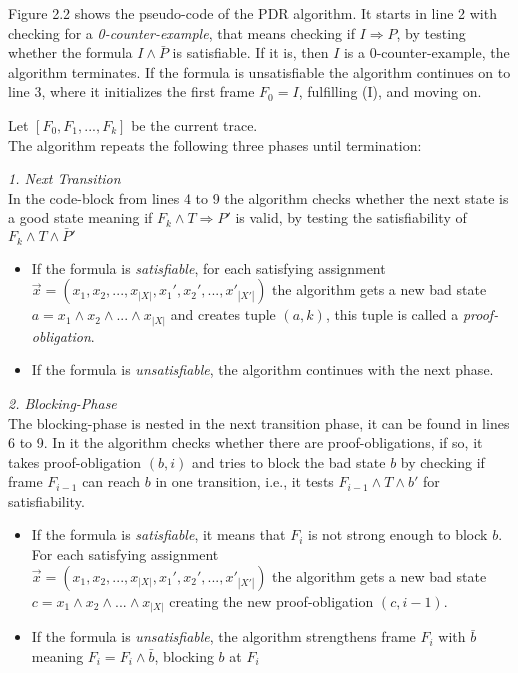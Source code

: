 \documentclass[11pt, a4paper, BCOR=10mm, ngerman]{scrbook}
\begin{document}
Figure 2.2 shows the pseudo-code of the PDR algorithm. It starts in line 2 with checking for a \textsl{0-counter-example}, that means checking if $I \Rightarrow P$, by testing whether the formula $I \land \bar P$ is satisfiable. If it is, then $I$ is a 0-counter-example, the algorithm terminates.
If the formula is unsatisfiable the algorithm continues on to line 3, where it initializes the first frame $F_0 = I$, fulfilling (I), and moving on. \par

Let $[F_0, F_1, ..., F_k]$ be the current trace. \\ 
The algorithm repeats the following three phases until termination: \par

\textsl{1. Next Transition} \\ In the code-block from lines 4 to 9 the algorithm checks whether the next state is a good state meaning if $F_k \land T \Rightarrow P'$ is valid, by testing the satisfiability of $F_k \land T \land \bar P'$ 
\begin{itemize}
\item If the formula is \textsl{satisfiable}, for each satisfying assignment \\ $\vec{x} = (x_1, x_2, ..., x_{|X|}, x_1', x_2', ..., x'_{|X'|})$ the algorithm gets a new bad state \\ $a = x_1 \land x_2 \land ... \land x_{|X|}$ and creates tuple $(a, k)$, this tuple is called a \textsl{proof-obligation}.

\item If the formula is \textsl{unsatisfiable}, the algorithm continues with the next phase. \\
\end{itemize}


\textsl{2. Blocking-Phase} \\ The blocking-phase is nested in the next transition phase, it can be found in lines 6 to 9. In it the algorithm checks whether there are proof-obligations, if so, 
it takes proof-obligation $(b, i)$ and tries to block the bad state $b$ by checking if frame $F_{i-1}$ can reach $b$ in one transition, i.e., it tests $F_{i-1} \land T \land b'$ for satisfiability.

\begin{itemize}
\item If the formula is \textsl{satisfiable}, it means that $F_{i}$ is not strong enough to block $b$. For each satisfying assignment \\ $\vec{x} = (x_1, x_2, ..., x_{|X|}, x_1', x_2', ..., x'_{|X'|})$ the algorithm gets a new bad state \\ $c = x_1 \land x_2 \land ... \land x_{|X|}$ creating the new proof-obligation $(c, i-1)$.

\item If the formula is \textsl{unsatisfiable}, the algorithm strengthens frame $F_{i}$ with $\bar b$ meaning $F_i = F_i \land \bar b$, blocking $b$ at $F_{i}$ 

\end{itemize}
\end{document}
